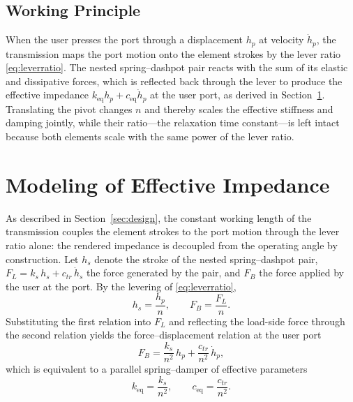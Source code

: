 ﻿\documentclass[conference]{IEEEtran}
\begin{document}
\subsection{Working Principle}
When the user presses the port through a displacement $h_p$ at velocity
$\dot{h}_p$, the transmission maps the port motion onto the element strokes
by the lever ratio \eqref{eq:leverratio}. The nested spring--dashpot pair
reacts with the sum of its elastic and dissipative forces, which is
reflected back through the lever to produce the effective impedance
$k_{\mathrm{eq}}h_p + c_{\mathrm{eq}}\dot{h}_p$ at the user port, as derived
in Section~\ref{sec:modeling}. Translating the pivot changes $n$ and thereby
scales the effective stiffness and damping jointly, while their ratio---the
relaxation time constant---is left intact because both elements scale with
the same power of the lever ratio.

\section{Modeling of Effective Impedance}\label{sec:modeling}
As described in Section~\ref{sec:design}, the constant working length of the
transmission couples the element strokes to the port motion through the
lever ratio alone: the rendered impedance is decoupled from the operating
angle by construction. Let $h_s$ denote the stroke of the nested
spring--dashpot pair, $F_L = k_s\,h_s + c_{tr}\,\dot{h}_s$ the force
generated by the pair, and $F_B$ the force applied by the user at the port.
By the levering of \eqref{eq:leverratio},
\begin{equation}
h_s = \frac{h_p}{n}, \qquad F_B = \frac{F_L}{n}. \label{eq:lever}
\end{equation}
Substituting the first relation into $F_L$ and reflecting the load-side
force through the second relation yields the force--displacement relation at
the user port
\begin{equation}
F_B = \frac{k_s}{n^{2}}\,h_p + \frac{c_{tr}}{n^{2}}\,\dot{h}_p ,
\label{eq:userforce}
\end{equation}
which is equivalent to a parallel spring--damper of effective parameters
\begin{equation}
k_{\mathrm{eq}} = \frac{k_s}{n^{2}}, \qquad
c_{\mathrm{eq}} = \frac{c_{tr}}{n^{2}}. \label{eq:effective}
\end{equation}
\end{document}
